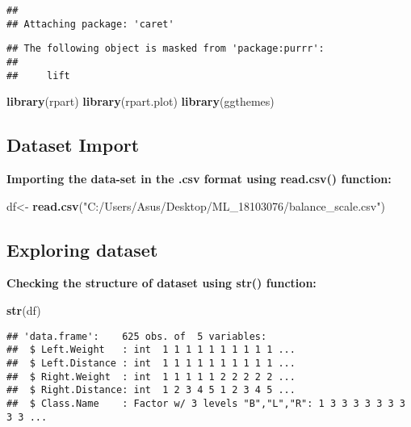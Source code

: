 \documentclass[
]{article}
\newenvironment{Shaded}{\begin{snugshade}}{\end{snugshade}}
\newcommand{\KeywordTok}[1]{\textcolor[rgb]{0.13,0.29,0.53}{\textbf{#1}}}
\newcommand{\NormalTok}[1]{#1}
\newcommand{\StringTok}[1]{\textcolor[rgb]{0.31,0.60,0.02}{#1}}
\begin{document}
\begin{verbatim}
## 
## Attaching package: 'caret'
\end{verbatim}

\begin{verbatim}
## The following object is masked from 'package:purrr':
## 
##     lift
\end{verbatim}

\begin{Shaded}
\begin{Highlighting}[]
\KeywordTok{library}\NormalTok{(rpart)}
\KeywordTok{library}\NormalTok{(rpart.plot)}
\KeywordTok{library}\NormalTok{(ggthemes)}
\end{Highlighting}
\end{Shaded}

\hypertarget{dataset-import}{%
\subsection{\texorpdfstring{\textbf{Dataset
Import}}{Dataset Import}}\label{dataset-import}}

\textbf{Importing the data-set in the .csv format using read.csv()
function:}

\begin{Shaded}
\begin{Highlighting}[]
\NormalTok{df<-}\StringTok{ }\KeywordTok{read.csv}\NormalTok{(}\StringTok{"C:/Users/Asus/Desktop/ML_18103076/balance_scale.csv"}\NormalTok{)}
\end{Highlighting}
\end{Shaded}

\hypertarget{exploring-dataset}{%
\subsection{\texorpdfstring{\textbf{Exploring
dataset}}{Exploring dataset}}\label{exploring-dataset}}

\textbf{Checking the structure of dataset using str() function:}

\begin{Shaded}
\begin{Highlighting}[]
\KeywordTok{str}\NormalTok{(df)}
\end{Highlighting}
\end{Shaded}

\begin{verbatim}
## 'data.frame':    625 obs. of  5 variables:
##  $ Left.Weight   : int  1 1 1 1 1 1 1 1 1 1 ...
##  $ Left.Distance : int  1 1 1 1 1 1 1 1 1 1 ...
##  $ Right.Weight  : int  1 1 1 1 1 2 2 2 2 2 ...
##  $ Right.Distance: int  1 2 3 4 5 1 2 3 4 5 ...
##  $ Class.Name    : Factor w/ 3 levels "B","L","R": 1 3 3 3 3 3 3 3 3 3 ...
\end{verbatim}
\end{document}

